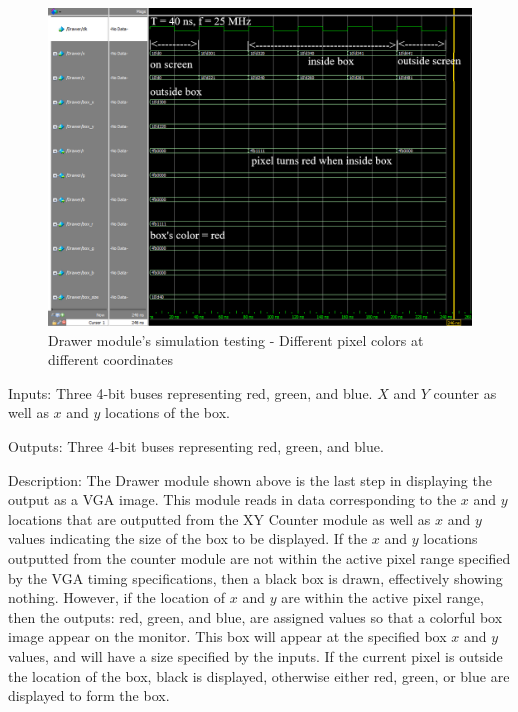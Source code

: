 \documentclass[12pt]{article}
\numberwithin{figure}{subsection}
\begin{document}
\begin{figure}[ht]
  \centering
  \includegraphics[width=\textwidth]{drawer_simulation.png}
  \caption{Drawer module’s simulation testing - Different pixel colors at different coordinates}
  \label{fig:drawer_simulation}
\end{figure}

Inputs: Three 4-bit buses representing red, green, and blue. $X$ and $Y$ counter as well as $x$ and $y$ locations of the box.

Outputs: Three 4-bit buses representing red, green, and blue.

Description: The Drawer module shown above is the last step in displaying the output as a VGA image. This module reads in data corresponding to the $x$ and $y$ locations that are outputted from the XY Counter module as well as $x$ and $y$ values indicating the size of the box to be displayed. If the $x$ and $y$ locations outputted from the counter module are not within the active pixel range specified by the VGA timing specifications, then a black box is drawn, effectively showing nothing. However, if the location of $x$ and $y$ are within the active pixel range, then the outputs: red, green, and blue, are assigned values so that a colorful box image appear on the monitor. This box will appear at the specified box $x$ and $y$ values, and will have a size specified by the inputs. If the current pixel is outside the location of the box, black is displayed, otherwise either red, green, or blue are displayed to form the box.

\newpage

\end{document}
